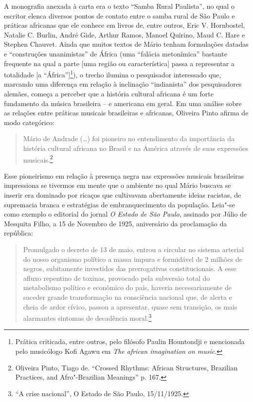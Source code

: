A monografia anexada à carta era o texto ``Samba Rural Paulista'', no
qual o escritor elenca diversos pontos de contato entre o samba rural de
São Paulo e práticas africanas que ele conhece em livros de, entre
outros, Eric V. Hornbostel, Natalie C. Burlin, André Gide, Arthur Ramos,
Manoel Quirino, Maud C. Hare e Stephen Chauvet. Ainda que muitos textos
de Mário tenham formulações datadas e ``construções unanimistas'' de
África (uma ``falácia metonímica'' bastante frequente na qual a parte
{[}uma região ou característica{]} passa a representar a totalidade {[}a
``África''{]}\footnote{Prática criticada, entre outros, pelo filósofo
  Paulin Hountondji e mencionada pelo musicólogo Kofi Agawu em \emph{The
  african imagination on music}.}), o trecho ilumina o pesquisador
interessado que, marcando uma diferença em relação à inclinação
``indianista'' dos pesquisadores alemães, começa a perceber que a
história cultural africana é um forte fundamento da música brasileira --
e americana em geral. Em uma análise sobre as relações entre práticas
musicais brasileiras e africanas, Oliveira Pinto afirma de modo
categórico:

\begin{quote}
Mário de Andrade (\ldots{}) foi pioneiro no entendimento da importância da
história cultural africana no Brasil e na América através de suas
expressões musicais.\footnote{Oliveira Pinto, Tiago de. ``Crossed
  Rhythms: African Structures, Brazilian Practices, and Afro"-Brazilian
  Meanings'' p. 167.}
\end{quote}

Esse pioneirismo em relação à presença negra nas expressões musicais
brasileiras impressiona se tivermos em mente que o ambiente no qual
Mário buscava se inserir era dominado por ricaços que cultivavam
abertamente ideias racistas, de supremacia branca e estratégias de
embranquecimento da população. Leia"-se como exemplo o editorial do
jornal \emph{O Estado de São Paulo}, assinado por Júlio de Mesquita
Filho, a 15 de Novembro de 1925, aniversário da proclamação da
república:

\begin{quote}
Promulgado o decreto de 13 de maio, entrou a circular no sistema
arterial do nosso organismo político a massa impura e formidável de 2
milhões de negros, subitamente investidos das prerrogativas
constitucionais. A esse afluxo repentino de toxinas, provocado pela
subversão total do metabolismo político e econômico do país, haveria
necessariamente de suceder grande transformação na consciência nacional
que, de alerta e cheia de ardor cívico, passou a apresentar, quase sem
transição, os mais alarmantes sintomas de decadência moral.\footnote{``A
  crise nacional'', O Estado de São Paulo, 15/11/1925.}
\end{quote}

